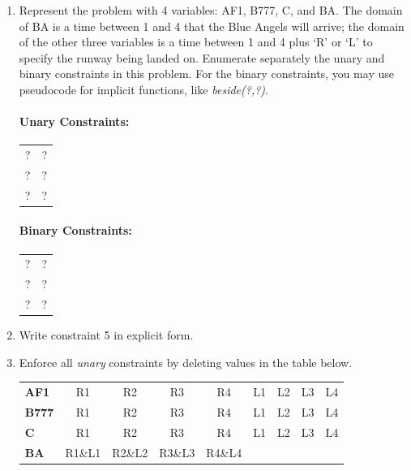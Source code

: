 \documentclass[11pt]{article}
\begin{document}
\begin{enumerate}

\item Represent the problem with 4 variables: AF1, B777, C, and
  BA. The domain of BA is a time between 1 and 4 that the Blue Angels
  will arrive; the domain of the other three variables is a time
  between 1 and 4 plus `R' or `L' to specify the runway being landed
  on.  Enumerate separately the unary and binary constraints in this
  problem. For the binary constraints, you may use pseudocode for
  implicit functions, like {\it beside(?,?)}.

  \paragraph{Unary Constraints:}

  \begin{flushleft}\begin{tabular}{ll}
  ?  & ? \\
  ?  & ? \\
  ?  & ? \\
  \end{tabular}\end{flushleft}

  \paragraph{Binary Constraints:}

  \begin{flushleft}\begin{tabular}{ll}
  ?  & ? \\
  ?  & ? \\
  ?  & ? \\
  \end{tabular}\end{flushleft}

\item Write constraint 5 in explicit form. \\

\item Enforce all {\it unary} constraints by deleting values in the table below.

\begin{center}\begin{tabular}{l|cccccccc|}
{\bf AF1}  & R1 & R2 & R3 & R4 & L1 & L2 & L3 & L4 \\ 
{\bf B777} & R1 & R2 & R3 & R4 & L1 & L2 & L3 & L4 \\ 
{\bf C}    & R1 & R2 & R3 & R4 & L1 & L2 & L3 & L4 \\ 
{\bf BA}   & R1\&L1 & R2\&L2 & R3\&L3 & R4\&L4 &  &  &  &  \\ 
\end{tabular}\end{center}


\end{enumerate}
\end{document}
